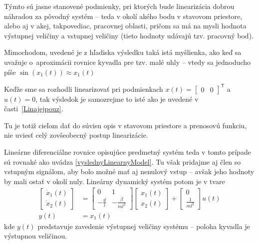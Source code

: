 \documentclass[a4paper, 10pt, ]{article}
\begin{document}
Týmto sú jasne stanovené podmienky, pri ktorých bude linearizácia dobrou náhradou za pôvodný systém -- teda v okolí akého bodu v stavovom priestore, alebo aj v akej, takpovediac, pracovnej oblasti, pričom sa má na mysli hodnota výstupnej veličiny a vstupnej veličiny (tieto hodnoty udávajú tzv. pracovný bod).

Mimochodom, uvedené je z hľadiska výsledku taká istá myšlienka, ako keď sa uvažuje o~aproximácii rovnice kyvadla pre tzv. malé uhly -- vtedy sa jednoducho píše $\sin(x_1(t)) \approx x_1(t)$




Keďže sme sa rozhodli linearizovať pri podmienkach $x(t) = \begin{bmatrix} 0 & 0 \end{bmatrix}^\mathsf{T}$ a $u(t) = 0$, tak výsledok je samozrejme to isté ako je uvedené v časti~\ref{Linajejpouz}.

Tu je totiž cieľom dať do súvisu opis v stavovom priestore a prenosovú funkciu, nie uviesť celý zovšeobecný postup linearizácie.

Lineárne diferenciálne rovnice opisujúce predmetný systém teda v tomto prípade sú rovnaké ako uvádza \eqref{vyslednyLinearnyModel}. Tu však pridajme aj člen so vstupným signálom, aby bolo možné mať aj nenulový vstup -- avšak jeho hodnoty by mali ostať v okolí nuly. Lineárny dynamický systém potom je v tvare
\begin{subequations} \label{vyslednyLinearnyModelajU}
    \begin{align}
    	\begin{bmatrix}
    		\dot x_1(t) \\ \dot x_2(t)
    	\end{bmatrix}
    	&=
    	\begin{bmatrix}
    		0 & 1 \\
    		- \displaystyle\frac{g}{l}  & - \displaystyle\frac{\beta}{ml^2}
    	\end{bmatrix}
    	\begin{bmatrix}
    		x_1(t)\\ x_2(t)
    	\end{bmatrix}
        +
        \begin{bmatrix}
    		0\\ \frac{1}{ml^2}
    	\end{bmatrix}
        u(t)
        \\
        y(t) &= x_1(t)
    \end{align}
\end{subequations}
kde $y(t)$ predstavuje zavedenie výstupnej veličiny systému -- poloha kyvadla je výstupnou veličinou.
\end{document}
